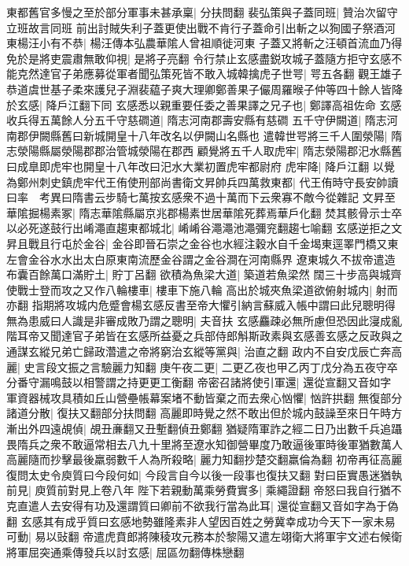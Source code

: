 東都舊官多慢之至於部分軍事未甚承稟|{
	分扶問翻}
裴弘策與子蓋同班|{
	贊治次留守立班故言同班}
前出討賊失利子蓋更使出戰不肯行子蓋命引出斬之以狥國子祭酒河東楊汪小有不恭|{
	楊汪傳本弘農華隂人曾祖順徙河東}
子蓋又將斬之汪頓首流血乃得免於是將吏震肅無敢仰視|{
	是將子亮翻}
令行禁止玄感盡鋭攻城子蓋隨方拒守玄感不能克然達官子弟應募從軍者聞弘策死皆不敢入城韓擒虎子世咢|{
	咢五各翻}
觀王雄子恭道虞世基子柔來護兒子淵裴藴子爽大理卿鄭善果子儼周羅㬋子仲等四十餘人皆降於玄感|{
	降戶江翻下同}
玄感悉以親重要任委之善果譯之兄子也|{
	鄭譯高祖佐命}
玄感收兵得五萬餘人分五千守慈磵道|{
	隋志河南郡壽安縣有慈磵}
五千守伊闕道|{
	隋志河南郡伊闕縣舊曰新城開皇十八年改名以伊闕山名縣也}
遣韓世咢將三千人圍滎陽|{
	隋志滎陽縣屬滎陽郡郡治管城滎陽在郡西}
顧覺將五千人取虎牢|{
	隋志滎陽郡汜水縣舊曰成臯即虎牢也開皇十八年改曰汜水大業初置虎牢都尉府}
虎牢降|{
	降戶江翻}
以覺為鄭州刺史鎮虎牢代王侑使刑部尚書衛文昇帥兵四萬救東都|{
	代王侑時守長安帥讀曰率　考異曰隋書云步騎七萬按玄感衆不過十萬而下云衆寡不敵今從雜記}
文昇至華隂掘楊素冢|{
	隋志華隂縣屬京兆郡楊素世居華隂死葬焉華戶化翻}
焚其骸骨示士卒以必死遂鼓行出崤澠直趨東都城北|{
	崤崤谷澠澠池澠彌兖翻趨七喻翻}
玄感逆拒之文昇且戰且行屯於金谷|{
	金谷即晉石崇之金谷也水經注穀水自千金堨東逕睪門橋又東左會金谷水水出太白原東南流歷金谷謂之金谷澗在河南縣界}
遼東城久不拔帝遣造布囊百餘萬口滿貯土|{
	貯丁呂翻}
欲積為魚梁大道|{
	築道若魚梁然}
闊三十步高與城齊使戰士登而攻之又作八輪樓車|{
	樓車下施八輪}
高出於城夾魚梁道欲俯射城内|{
	射而亦翻}
指期將攻城内危蹙會楊玄感反書至帝大懼引納言蘇威入帳中謂曰此兒聰明得無為患威曰人識是非審成敗乃謂之聰明|{
	夫音扶}
玄感麤疎必無所慮但恐因此寖成亂階耳帝又聞達官子弟皆在玄感所益憂之兵部侍郎斛斯政素與玄感善玄感之反政與之通謀玄縱兄弟亡歸政濳遣之帝將窮治玄縱等黨與|{
	治直之翻}
政内不自安戊辰亡奔高麗|{
	史言段文振之言驗麗力知翻}
庚午夜二更|{
	二更乙夜也甲乙丙丁戊分為五夜守卒分番守漏鳴鼓以相警謂之持更更工衡翻}
帝密召諸將使引軍還|{
	還從宣翻又音如字}
軍資器械攻具積如丘山營壘帳幕案堵不動皆棄之而去衆心忷懼|{
	忷許拱翻}
無復部分諸道分散|{
	復扶又翻部分扶問翻}
高麗即時覺之然不敢出但於城内鼓譟至來日午時方漸出外四遠覘偵|{
	覘丑亷翻又丑塹翻偵丑鄭翻}
猶疑隋軍詐之經二日乃出數千兵追躡畏隋兵之衆不敢逼常相去八九十里將至遼水知御營畢度乃敢逼後軍時後軍猶數萬人高麗隨而抄擊最後羸弱數千人為所殺略|{
	麗力知翻抄楚交翻羸倫為翻}
初帝再征高麗復問太史令庾質曰今段何如|{
	今段言自今以後一段事也復扶又翻}
對曰臣實愚迷猶執前見|{
	庾質前對見上卷八年}
陛下若親動萬乘勞費實多|{
	乘繩證翻}
帝怒曰我自行猶不克直遣人去安得有功及還謂質曰卿前不欲我行當為此耳|{
	還從宣翻又音如字為于偽翻}
玄感其有成乎質曰玄感地勢雖隆素非人望因百姓之勞冀幸成功今天下一家未易可動|{
	易以䜴翻}
帝遣虎賁郎將陳稜攻元務本於黎陽又遣左翊衛大將軍宇文述右候衛將軍屈突通乘傳發兵以討玄感|{
	屈區勿翻傳株戀翻}
